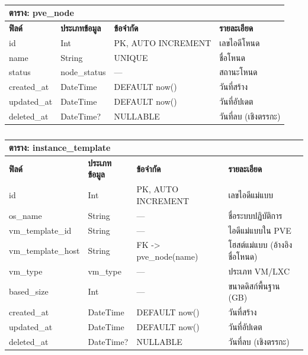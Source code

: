 \begin{table}[htbp]
    \caption{}\label{tab3:pve_node_fields}
    \centering
    \renewcommand{\arraystretch}{1.2}
    \small
    \begin{tabular}{p{} p{} p{} p{}}
        \hline
        \multicolumn{4}{l}{\textbf{ตาราง: pve\_node}} \\
        \hline
            \textbf{ฟิลด์} & \textbf{ประเภทข้อมูล} & \textbf{ข้อจำกัด} & \textbf{รายละเอียด} \\
        \hline
        id & Int & PK, AUTO INCREMENT & เลขไอดีโหนด \\
        name & String & UNIQUE & ชื่อโหนด \\
        status & node\_status & — & สถานะโหนด \\
        created\_at & DateTime & DEFAULT now() & วันที่สร้าง \\
        updated\_at & DateTime & DEFAULT now() & วันที่อัปเดต \\
        deleted\_at & DateTime? & NULLABLE & วันที่ลบ (เชิงตรรกะ) \\
        \hline
    \end{tabular}
\end{table}

\begin{table}[htbp]
    \caption{}\label{tab3:instance_template_fields}
    \centering
    \renewcommand{\arraystretch}{1.2}
    \small
    \begin{tabular}{p{} p{} p{} p{}}
        \hline
        \multicolumn{4}{l}{\textbf{ตาราง: instance\_template}} \\
        \hline
            \textbf{ฟิลด์} & \textbf{ประเภทข้อมูล} & \textbf{ข้อจำกัด} & \textbf{รายละเอียด} \\
        \hline
        id & Int & PK, AUTO INCREMENT & เลขไอดีแม่แบบ \\
        os\_name & String & — & ชื่อระบบปฏิบัติการ \\
        vm\_template\_id & String & — & ไอดีแม่แบบใน PVE \\
        vm\_template\_host & String & FK -> pve\_node(name) & โฮสต์แม่แบบ (อ้างอิงชื่อโหนด) \\
        vm\_type & vm\_type & — & ประเภท VM/LXC \\
        based\_size & Int & — & ขนาดดิสก์พื้นฐาน (GB) \\
        created\_at & DateTime & DEFAULT now() & วันที่สร้าง \\
        updated\_at & DateTime & DEFAULT now() & วันที่อัปเดต \\
        deleted\_at & DateTime? & NULLABLE & วันที่ลบ (เชิงตรรกะ) \\
        \hline
    \end{tabular}
\end{table}

